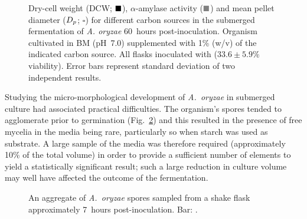 \begin{figure}[tb]
	\centering
  \caption{Dry-cell weight (DCW; $\blacksquare$), $\alpha$-amylase activity ($\color{gray} \bs$) and mean pellet diameter ($D_p$; $\square$) for different carbon sources in the submerged fermentation of \emph{A. oryzae} 60~hours post-inoculation. Organism cultivated in BM (pH~7.0) supplemented with 1\% (w/v) of the indicated carbon source. All flasks inoculated with  ($33.6 \pm 5.9$\% viability). Error bars represent standard deviation of two independent results.}
	\label{fig:AaDCWApC}
\end{figure}

Studying the micro-morphological development of \emph{A.~oryzae} in submerged culture had associated practical difficulties. The organism's spores tended to agglomerate prior to germination (Fig.~\ref{fig:SporeAgg}) and this resulted in the presence of free mycelia in the media being rare, particularly so when starch was used as substrate. A large sample of the media was therefore required (approximately 10\% of the total volume) in order to provide a sufficient number of elements to yield a statistically significant result; such a large reduction in culture volume may well have affected the outcome of the fermentation.

\begin{figure}[htbp]
	\centering
	\caption{An aggregate of \emph{A.~oryzae} spores sampled from a shake flask approximately 7~hours post-inoculation. Bar: .}
	\label{fig:SporeAgg}
\end{figure}

